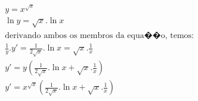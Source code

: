 \begin{ex}
\begin{align}
&y=x^{\sqrt{x}}\nonumber\\
&\ln{y}=\sqrt{x}.\ln{x}\nonumber\\
&\text{derivando ambos os membros da equa��o, temos:}\nonumber\\
&\frac{1}{y}.y'=\frac{1}{2\sqrt{x}}.\ln{x}=\sqrt{x}.\frac{1}{x}\nonumber\\
&y'=y\left(\frac{1}{2\sqrt{x}}.\ln{x}+\sqrt{x}.\frac{1}{x}\right)\nonumber\\
&y'=x^{\sqrt{x}}\left(\frac{1}{2\sqrt{x}}.\ln{x}+\sqrt{x}.\frac{1}{x}\right)\nonumber
\end{align}
\end{ex}